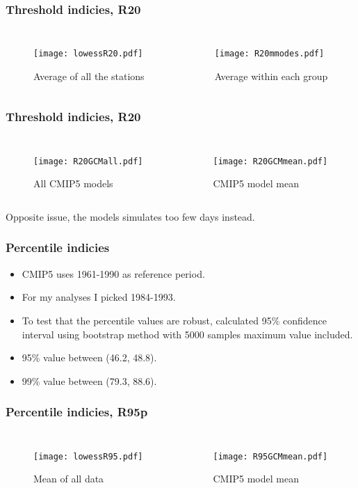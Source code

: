 \documentclass{beamer}
\begin{document}
\begin{frame}
\frametitle{Threshold indicies, R20}
\begin{columns}
	\begin{figure}
		\texttt{[image: lowessR20.pdf]}
		\caption{Average of all the stations}
	\end{figure}
	\begin{figure}
		\texttt{[image: R20mmodes.pdf]}
		\caption{Average within each group}
	\end{figure}
\end{columns}
\end{frame}

\begin{frame}
\frametitle{Threshold indicies, R20}
\begin{columns}
\begin{figure}
	\texttt{[image: R20GCMall.pdf]}
	\caption{All CMIP5 models}
\end{figure}
\begin{figure}
	\texttt{[image: R20GCMmean.pdf]}
	\caption{CMIP5 model mean}
\end{figure}
\end{columns}
Opposite issue, the models simulates too few days instead.
\end{frame}

\begin{frame}
\frametitle{Percentile indicies}
\begin{itemize}
	\item CMIP5 uses 1961-1990 as reference period. 
	\item For my analyses I picked 1984-1993.
	\item To test that the percentile values are robust, calculated 95\% confidence interval using bootstrap method with 5000 samples maximum value included.
	\item 95\% value between (46.2, 48.8).
	\item 99\% value between  (79.3, 88.6).
\end{itemize}
\end{frame}

\begin{frame}
\frametitle{Percentile indicies, R95p}
\begin{columns}
	\begin{figure}
		\texttt{[image: lowessR95.pdf]}
		\caption{Mean of all data}
	\end{figure}
	\begin{figure}
		\texttt{[image: R95GCMmean.pdf]}
		\caption{CMIP5 model mean}
	\end{figure}
\end{columns}
\end{frame}
\end{document}
